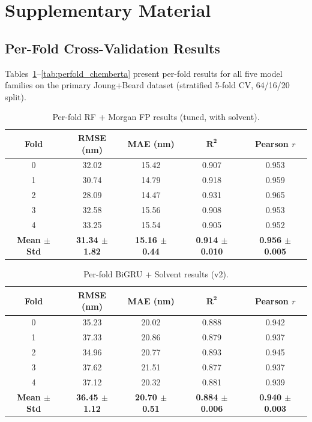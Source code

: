 \documentclass[11pt,a4paper]{article}
\begin{document}
\appendix
\section{Supplementary Material}
\label{sec:supplementary}

\subsection{Per-Fold Cross-Validation Results}
\label{sec:perfold}

Tables~\ref{tab:perfold_rf}--\ref{tab:perfold_chemberta} present per-fold results for all five model families on the primary Joung+Beard dataset (stratified 5-fold CV, 64/16/20 split).

\begin{table}[H]
\centering
\caption{Per-fold RF + Morgan FP results (tuned, with solvent).}
\label{tab:perfold_rf}
\begin{tabular}{ccccc}
\toprule
\textbf{Fold} & \textbf{RMSE (nm)} & \textbf{MAE (nm)} & $\boldsymbol{R^2}$ & \textbf{Pearson $r$} \\
\midrule
0 & 32.02 & 15.42 & 0.907 & 0.953 \\
1 & 30.74 & 14.79 & 0.918 & 0.959 \\
2 & 28.09 & 14.47 & 0.931 & 0.965 \\
3 & 32.58 & 15.56 & 0.908 & 0.953 \\
4 & 33.25 & 15.54 & 0.905 & 0.952 \\
\midrule
\textbf{Mean $\pm$ Std} & \textbf{31.34 $\pm$ 1.82} & \textbf{15.16 $\pm$ 0.44} & \textbf{0.914 $\pm$ 0.010} & \textbf{0.956 $\pm$ 0.005} \\
\bottomrule
\end{tabular}
\end{table}

\begin{table}[H]
\centering
\caption{Per-fold BiGRU + Solvent results (v2).}
\label{tab:perfold_bigru}
\begin{tabular}{ccccc}
\toprule
\textbf{Fold} & \textbf{RMSE (nm)} & \textbf{MAE (nm)} & $\boldsymbol{R^2}$ & \textbf{Pearson $r$} \\
\midrule
0 & 35.23 & 20.02 & 0.888 & 0.942 \\
1 & 37.33 & 20.86 & 0.879 & 0.937 \\
2 & 34.96 & 20.77 & 0.893 & 0.945 \\
3 & 37.62 & 21.51 & 0.877 & 0.937 \\
4 & 37.12 & 20.32 & 0.881 & 0.939 \\
\midrule
\textbf{Mean $\pm$ Std} & \textbf{36.45 $\pm$ 1.12} & \textbf{20.70 $\pm$ 0.51} & \textbf{0.884 $\pm$ 0.006} & \textbf{0.940 $\pm$ 0.003} \\
\bottomrule
\end{tabular}
\end{table}
\end{document}

